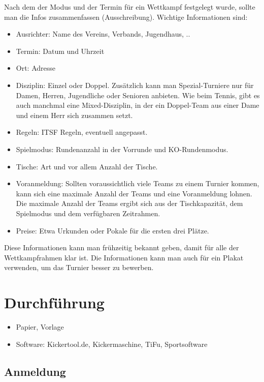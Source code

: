 Nach dem der Modus und der Termin für ein Wettkampf festgelegt wurde, sollte man die Infos zusammenfassen (Ausschreibung). Wichtige Informationen sind:
\begin{itemize}
\item Ausrichter: Name des Vereins, Verbands, Jugendhaus, ..
\item Termin: Datum und Uhrzeit
\item Ort: Adresse
\item Disziplin: Einzel oder Doppel. Zusätzlich kann man Spezial-Turniere nur für Damen, Herren, Jugendliche oder Senioren anbieten. Wie beim Tennis, gibt es auch manchmal eine Mixed-Disziplin, in der ein Doppel-Team aus einer Dame und einem Herr sich zusammen setzt.   
\item Regeln: ITSF Regeln, eventuell angepasst.
\item Spielmodus: Rundenanzahl in der Vorrunde und KO-Rundenmodus.
\item Tische: Art und vor allem Anzahl der Tische. 
\item Voranmeldung: Sollten voraussichtlich viele Teams zu einem Turnier kommen, kann sich eine maximale Anzahl der Teams und eine Voranmeldung lohnen. Die maximale Anzahl der Teams ergibt sich aus der Tischkapazität, dem Spielmodus und dem verfügbaren Zeitrahmen.   
\item Preise: Etwa Urkunden oder Pokale für die ersten drei Plätze.
\end{itemize}
Diese Informationen kann man frühzeitig bekannt geben, damit für alle der Wettkampfrahmen klar ist.
Die Informationen kann man auch für ein Plakat verwenden, um das Turnier besser zu bewerben. 


\section{Durchführung}
\label{turniere:durchfuehrung}

\begin{itemize}
\item Papier, Vorlage
\item Software: Kickertool.de, Kickermaschine, TiFu, Sportsoftware
\end{itemize}

\subsection{Anmeldung}
\label{turniere:durchfuehrung:anmeldung}

